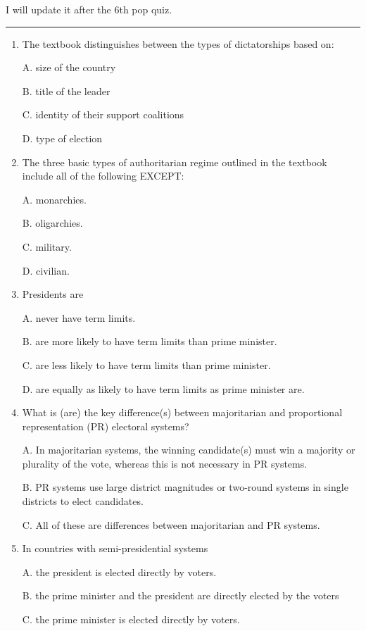 \documentclass[
]{book}
\begin{document}
I will update it after the 6th pop quiz.

\begin{center}\rule{0.5\linewidth}{0.5pt}\end{center}

\begin{enumerate}
\def\labelenumi{\arabic{enumi}.}
\item
  The textbook distinguishes between the types of dictatorships based on:

  A. size of the country

  B. title of the leader

  C. identity of their support coalitions

  D. type of election
\item
  The three basic types of authoritarian regime outlined in the textbook include all of the following EXCEPT:

  A. monarchies.

  B. oligarchies.

  C. military.

  D. civilian.
\item
  Presidents are

  A. never have term limits.

  B. are more likely to have term limits than prime minister.

  C. are less likely to have term limits than prime minister.

  D. are equally as likely to have term limits as prime minister are.
\item
  What is (are) the key difference(s) between majoritarian and proportional representation (PR) electoral systems?

  A. In majoritarian systems, the winning candidate(s) must win a majority or plurality of the vote, whereas this is not necessary in PR systems.

  B. PR systems use large district magnitudes or two-round systems in single districts to elect candidates.

  C. All of these are differences between majoritarian and PR systems.
\item
  In countries with semi-presidential systems

  A. the president is elected directly by voters.

  B. the prime minister and the president are directly elected by the voters

  C. the prime minister is elected directly by voters.


\end{enumerate}
\end{document}
